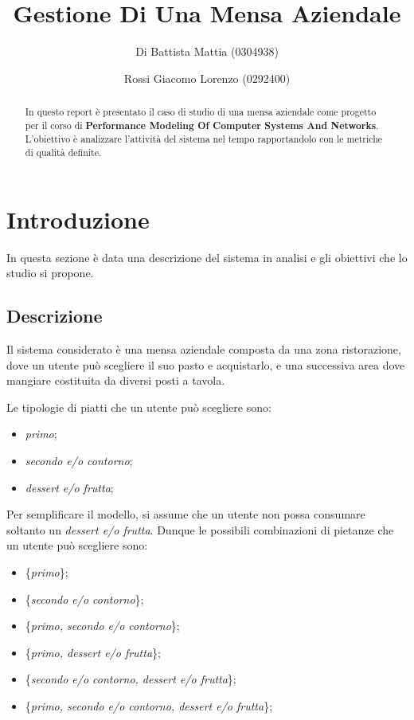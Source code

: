 \documentclass{article}
\begin{document}
\title{Gestione Di Una Mensa Aziendale}

\author[1]{Di Battista Mattia (0304938)}
\author[2]{Rossi Giacomo Lorenzo (0292400)}

\date{}

\maketitle

\begin{abstract}
In questo report è presentato il caso di studio di una mensa aziendale come progetto per il corso di \textbf{Performance Modeling Of Computer Systems And Networks}. L'obiettivo è analizzare l'attività del sistema nel tempo rapportandolo con le metriche di qualità definite.
\end{abstract}

\section{Introduzione}

In questa sezione è data una descrizione del sistema in analisi e gli obiettivi che lo studio si propone.

\subsection{Descrizione}\label{Subsec:descr}

Il sistema considerato è una mensa aziendale composta da una zona ristorazione, dove un utente può scegliere il suo pasto e acquistarlo, e una successiva area dove mangiare costituita da diversi posti a tavola.

Le tipologie di piatti che un utente può scegliere sono:
\begin{itemize}
\item \textit{primo};
\item \textit{secondo e/o contorno};
\item \textit{dessert e/o frutta};
\end{itemize}
Per semplificare il modello, si assume che un utente non possa consumare soltanto un \textit{dessert e/o frutta}. Dunque le possibili combinazioni di pietanze che un utente può scegliere sono: 
\begin{itemize}
\item \{\textit{primo}\};
\item \{\textit{secondo e/o contorno}\};
\item \{\textit{primo, secondo e/o contorno}\};
\item \{\textit{primo, dessert e/o frutta}\};
\item \{\textit{secondo e/o contorno, dessert e/o frutta}\};
\item \{\textit{primo, secondo e/o contorno, dessert e/o frutta}\};
\end{itemize}
\end{document}
